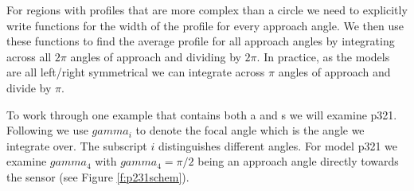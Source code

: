 \documentclass[a4paper,10pt,reqno,oneside]{amsart}
\begin{document}
For regions with profiles that are more complex than a circle we need to explicitly write functions for the width of the profile for every approach angle. We then use these functions to find the average profile for all approach angles by integrating across all $2\pi$ angles of approach and dividing by $2\pi$. In practice, as the models are all left/right symmetrical we can integrate across $\pi$ angles of approach and divide by $\pi$.

To work through one example that contains both a and s we will examine p321. Following \cite{Rowcliffe2008estimating} we use $gamma_i$ to denote the focal angle which is the angle we integrate over. The subscript $i$ distinguishes different angles. For model p321 we examine $ gamma_4$ with  $ gamma_4 = \pi/2$ being an approach angle directly towards the sensor (see Figure \ref{f:p231schem}).
\end{document}
